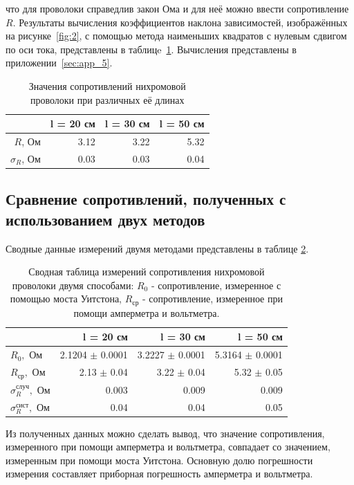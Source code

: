 \documentclass{article}
\begin{document}
что для проволоки справедлив закон Ома и для неё можно ввести сопротивление $R$. 
Результаты вычисления коэффициентов наклона зависимостей, изображённых на рисунке~\ref{fig:2}, с помощью метода наименьших квадратов с нулевым
сдвигом по оси тока, представлены в таблицe~\ref{tab:5}. Вычисления представлены в приложении~\ref{sec:app_5}.
\begin{table}[H]
    \label{tab:5}
    \begin{center}
        \begin{tabular}{|r|r|r|r|}
            \hline
                           & l = 20 см & l = 30 см & l = 50 см \\
            \hline
            $R$, Ом        & 3.12      & 3.22      & 5.32      \\
            $\sigma_R$, Ом & 0.03      & 0.03      & 0.04      \\
            \hline
        \end{tabular}
    \end{center}
    \caption{Значения сопротивлений нихромовой проволоки при различных её длинах}
\end{table}
\subsection{Сравнение сопротивлений, полученных с использованием двух методов}
Сводные данные измерений двумя методами представлены в таблице \ref{tab:7}.
\begin{table}[H]
    \label{tab:7}
    \begin{center}
        \begin{tabular}{|l|r|r|r|}
            \hline
                                                     & l = 20 см           & l = 30 см           & l = 50 см           \\
            \hline
            $R_0, \textrm{ Ом}$                      & 2.1204 $\pm$ 0.0001 & 3.2227 $\pm$ 0.0001 & 5.3164 $\pm$ 0.0001 \\
            $R_{\textrm{ср}}, \textrm{ Ом}$          & 2.13 $\pm$ 0.04     & 3.22 $\pm$ 0.04     & 5.32 $\pm$ 0.05     \\
            $\sigma_R^{\textrm{случ}}, \textrm{ Ом}$ & 0.003               & 0.009               & 0.009               \\
            $\sigma_R^{\textrm{сист}}, \textrm{ Ом}$ & 0.04                & 0.04                & 0.05                \\
            \hline
        \end{tabular}
    \end{center}
    \caption{Сводная таблица измерений сопротивления нихромовой проволоки двумя способами:
    $R_0$ - сопротивление, измеренное с помощью моста Уитстона, $R_{\textrm{ср}}$ - сопротивление, измеренное при помощи амперметра и вольтметра. }
\end{table}
Из полученных данных можно сделать вывод, что значение сопротивления, измеренного при помощи амперметра и вольтметра, совпадает 
со значением, измеренным при помощи моста Уитстона. Основную долю погрешности измерения составляет приборная погрешность амперметра и вольтметра.
\end{document}
